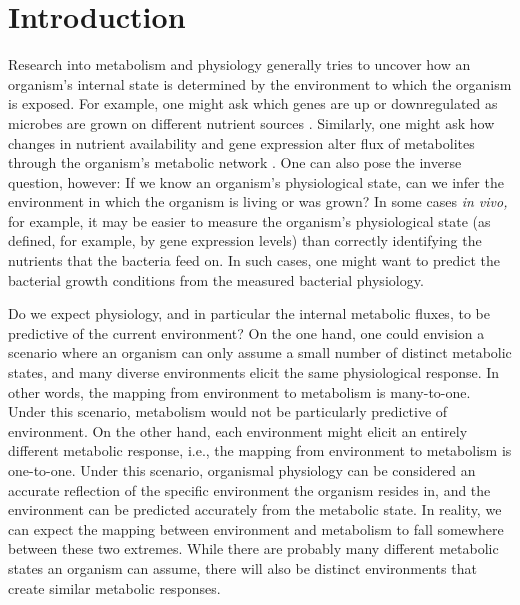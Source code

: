 \documentclass[12pt]{article}
\begin{document}

\section{Introduction}

Research into metabolism and physiology generally tries to uncover how an organism's internal state is determined by the environment to which the organism is exposed. For example, one might ask which genes are up or downregulated as microbes are grown on different nutrient sources \cite{Taoetal1999,Huaetal2004,Wuetal2004}. Similarly, one might ask how changes in nutrient availability and gene expression alter flux of metabolites through the organism's metabolic network \cite{FischerSauer2003,Leeetal2009,Boeretal2010,HaverkornvanRijsewijketal2011}. One can also pose the inverse question, however: If we know an organism's physiological state, can we infer the environment in which the organism is living or was grown? In some cases \emph{in vivo,} for example, it may be easier to measure the organism's physiological state (as defined, for example, by gene expression levels) than correctly identifying the nutrients that the bacteria feed on. In such cases, one might want to predict the bacterial growth conditions from the measured bacterial physiology. 

Do we expect physiology, and in particular the internal metabolic fluxes, to be predictive of the current environment? On the one hand, one could envision a scenario where an organism can only assume a small number of distinct metabolic states, and many diverse environments elicit the same physiological response. In other words, the mapping from environment to metabolism is many-to-one. Under this scenario, metabolism would not be particularly predictive of environment. On the other hand, each environment might elicit an entirely different metabolic response, i.e., the mapping from environment to metabolism is one-to-one. Under this scenario, organismal physiology can be considered an accurate reflection of the specific environment the organism resides in, and the environment can be predicted accurately from the metabolic state. In reality, we can expect the mapping between environment and metabolism to fall somewhere between these two extremes. While there are probably many different metabolic states an organism can assume, there will also be distinct environments that create similar metabolic responses.
\end{document}
